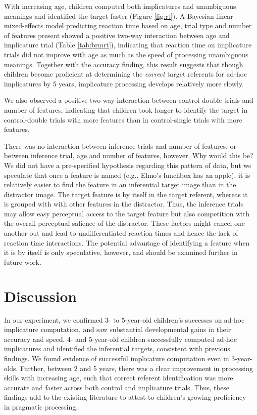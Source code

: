 \documentclass[man]{apa6}
\begin{document}
With increasing age, children computed both implicatures and unambiguous
meanings and identified the target faster (Figure \ref{fig:rt}). A
Bayesian linear mixed-effects model predicting reaction time based on
age, trial type and number of features present showed a positive two-way
interaction between age and implicature trial (Table \ref{tab:brmrt}),
indicating that reaction time on implicature trials did not improve with
age as much as the speed of processing unambiguous meanings. Together
with the accuracy finding, this result suggests that though children
become proficient at determining the \emph{correct} target referents for
ad-hoc implicatures by 5 years, implicature processing develops
relatively more slowly.

We also observed a positive two-way interaction between control-double
trials and number of features, indicating that children took longer to
identify the target in control-double trials with more features than in
control-single trials with more features.

There was no interaction between inference trials and number of
features, or between inference trial, age and number of features,
however. Why would this be? We did not have a pre-specified hypothesis
regarding this pattern of data, but we speculate that once a feature is
named (e.g., Elmo's lunchbox has an apple), it is relatively easier to
find the feature in an inferential target image than in the distractor
image. The target feature is by itself in the target referent, whereas
it is grouped with with other features in the distractor. Thus, the
inference trials may allow easy perceptual access to the target feature
but also competition with the overall perceptual salience of the
distractor. These factors might cancel one another out and lead to
undifferentiated reaction times and hence the lack of reaction time
interactions. The potential advantage of identifying a feature when it
is by itself is only speculative, however, and should be examined
further in future work.

\section{Discussion}\label{discussion}

In our experiment, we confirmed 3- to 5-year-old children's successes on
ad-hoc implicature computation, and saw substantial developmental gains
in their accuracy and speed. 4- and 5-year-old children successfully
computed ad-hoc implicatures and identified the inferential targets,
consistent with previous findings. We found evidence of successful
implicature computation even in 3-year-olds. Further, between 2 and 5
years, there was a clear improvement in processing skills with
increasing age, such that correct referent identification was more
accurate and faster across both control and implicature trials. Thus,
these findings add to the existing literature to attest to children's
growing proficiency in pragmatic processing.
\end{document}

